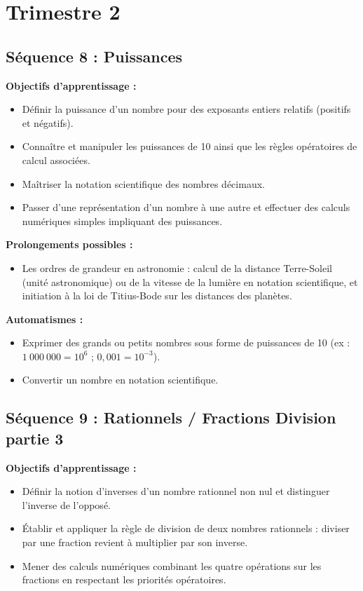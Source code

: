\documentclass[11pt,a4paper]{article}
\begin{document}
\section{Trimestre 2}

\subsection{Séquence 8 : Puissances}
\textbf{Objectifs d’apprentissage :}
\begin{itemize}
    \item Définir la puissance d’un nombre pour des exposants entiers relatifs (positifs et négatifs).
    \item Connaître et manipuler les puissances de 10 ainsi que les règles opératoires de calcul associées.
    \item Maîtriser la notation scientifique des nombres décimaux.
    \item Passer d’une représentation d’un nombre à une autre et effectuer des calculs numériques simples impliquant des puissances.
\end{itemize}

\textbf{Prolongements possibles :}
\begin{itemize}
    \item Les ordres de grandeur en astronomie : calcul de la distance Terre-Soleil (unité astronomique) ou de la vitesse de la lumière en notation scientifique, et initiation à la loi de Titius-Bode sur les distances des planètes.
\end{itemize}

\textbf{Automatismes :}
\begin{itemize}
    \item Exprimer des grands ou petits nombres sous forme de puissances de 10 (ex : $1~000~000 = 10^6$ ; $0,001 = 10^{-3}$).
    \item Convertir un nombre en notation scientifique.
\end{itemize}

\subsection{Séquence 9 : Rationnels / Fractions Division partie 3}
\textbf{Objectifs d’apprentissage :}
\begin{itemize}
    \item Définir la notion d'inverses d'un nombre rationnel non nul et distinguer l'inverse de l'opposé.
    \item Établir et appliquer la règle de division de deux nombres rationnels : diviser par une fraction revient à multiplier par son inverse.
    \item Mener des calculs numériques combinant les quatre opérations sur les fractions en respectant les priorités opératoires.
\end{itemize}
\end{document}
